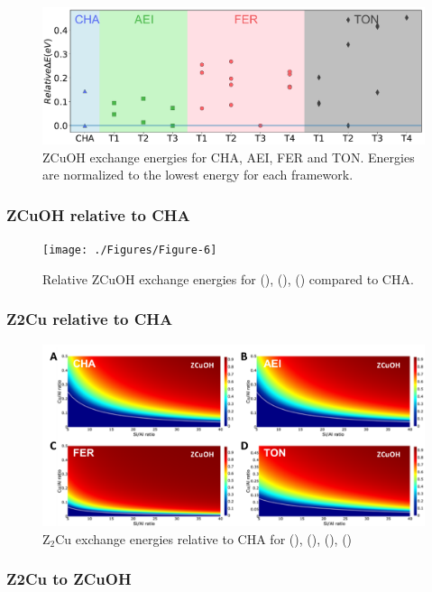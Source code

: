 \documentclass[12pt]{article}
\begin{document}
\begin{figure}[H]
\centering
  \includegraphics[width=5.2in]{./Figures/Figure-3}
  \caption{ZCuOH exchange energies for CHA, AEI, FER and TON. Energies are normalized to the lowest energy for each framework.}
  \label{ZH energies}
\end{figure}

\subsubsection*{ZCuOH relative to CHA}
\begin{figure}[H]
\centering
  \texttt{[image: ./Figures/Figure-6]}
  \caption{Relative ZCuOH exchange energies  for (), (), () compared to CHA.}
  \label{ZH}
\end{figure}

\subsubsection*{Z2Cu relative to CHA}
\begin{figure}[H]
\centering
  \includegraphics[width=5.2in]{./Figures/Figure-5}
  \caption{Z$_{2}$Cu exchange energies relative to CHA for (), (), (), ()}
  \label{PhaseDiagram}
\end{figure}

\subsubsection*{Z2Cu to ZCuOH}
\end{document}
